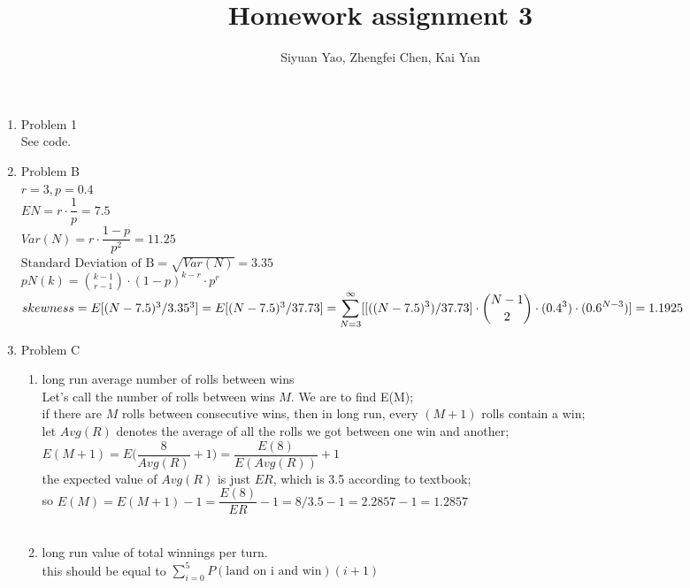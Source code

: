\documentclass{amsart}
\begin{document}
\title{Homework assignment 3}
\author{Siyuan Yao, Zhengfei Chen, Kai Yan}
\maketitle

\thispagestyle{empty}
\pagestyle{empty}

\begin{enumerate}
\item Problem 1\\
See code.
\item Problem B\\
$r = 3, p = 0.4$\\
$EN = r\cdot \dfrac{1}{p}=7.5$\\
$Var(N) = r\cdot \dfrac{1-p}{p^2}=11.25$\\
$\text{Standard Deviation of B} = \sqrt{Var(N)}= 3.35$\\
$pN(k) = \displaystyle\binom{k-1}{r-1}\cdot(1-p)^{k-r}\cdot p^r$\\
$skewness = E[(N-7.5)^3 / 3.35^3] = E[(N-7.5)^3/37.73] \\= \displaystyle\sum^\infty_{N=3}[ [((N-7.5)^3) / 37.73]\cdot \binom{N-1}{2} \cdot(0.4^3) \cdot (0.6 ^ {N-3} ) ]= 1.1925$
\item Problem C\\
\begin{enumerate}
\item long run average number of rolls between wins\\
 Let's call the number of rolls between wins $M$. We are to find E(M);\\
  if there are $M$ rolls between consecutive wins, then in long run, every $(M+1)$ rolls contain a win;\\
  let $Avg(R)$ denotes the average of all the rolls we got between one win and another;\\
  $E(M+1) = E\bigg(\dfrac{8}{Avg(R)}+1\bigg)=\dfrac{E(8)}{ E(Avg(R))} +1$\\
  the expected value of $Avg(R)$ is just $ER$, which is 3.5 according to textbook;\\
so $E(M) = E(M+1) -1 = \dfrac{E(8)}{ER} -1 = 8/3.5 -1 = 2.2857 -1 = 1.2857$\\\\
\item long run value of total winnings per turn. \\
  this should be equal to $\displaystyle\sum^5_{i=0}P(\text{land on i and win})(i+1)$\\

\end{enumerate}
\end{enumerate}
\end{document}
